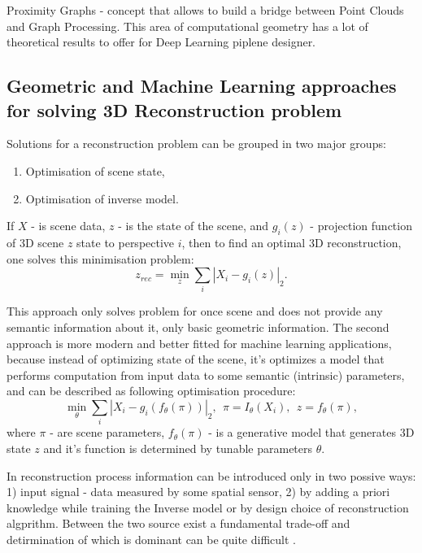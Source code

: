 Proximity Graphs - concept that allows to build a bridge between Point Clouds and Graph Processing. This area of computational geometry has a lot of theoretical results to offer for Deep Learning piplene designer.

\subsection{Geometric and Machine Learning approaches for solving 3D Reconstruction problem}

Solutions for a reconstruction problem can be grouped in two major groups:
\begin{enumerate}
    \item Optimisation of scene state,
    \item Optimisation of inverse model.
\end{enumerate}

If $X$ - is scene data, $z$ - is the state of the scene, and $g_i(z)$ - projection function of 3D scene $z$ state to perspective $i$, then to find an optimal 3D reconstruction, one solves this minimisation problem:
\begin{equation}
z_{rec} = \min_z\sum_i|X_i-g_i(z)|_2 .
\end{equation}

This approach only solves problem for once scene and does not provide any semantic information about it, only basic geometric information. 
The second approach is more modern and better fitted for machine learning applications, because instead of optimizing state of the scene, it's optimizes a model that performs computation from input data to some semantic (intrinsic) parameters, and can be described as following optimisation procedure:
\begin{equation}
\min_\theta\sum_i|X_i-g_i(f_\theta(\pi))|_2,\ \ \pi=I_\theta(X_i),\ \ z=f_\theta(\pi),
\end{equation}
where $\pi$ - are scene parameters, $f_\theta(\pi)$ - is a generative model that generates 3D state $z$ and it's function is determined by tunable parameters $\theta$.


In reconstruction process information can be introduced only in two possive ways: 1) input signal - data measured by some spatial sensor, 2) by adding a priori knowledge while training the Inverse model or by design choice of reconstruction algprithm. Between the two source exist a fundamental trade-off and detirmination of which is dominant can be quite difficult \cite{tatarchenko2019single}.



